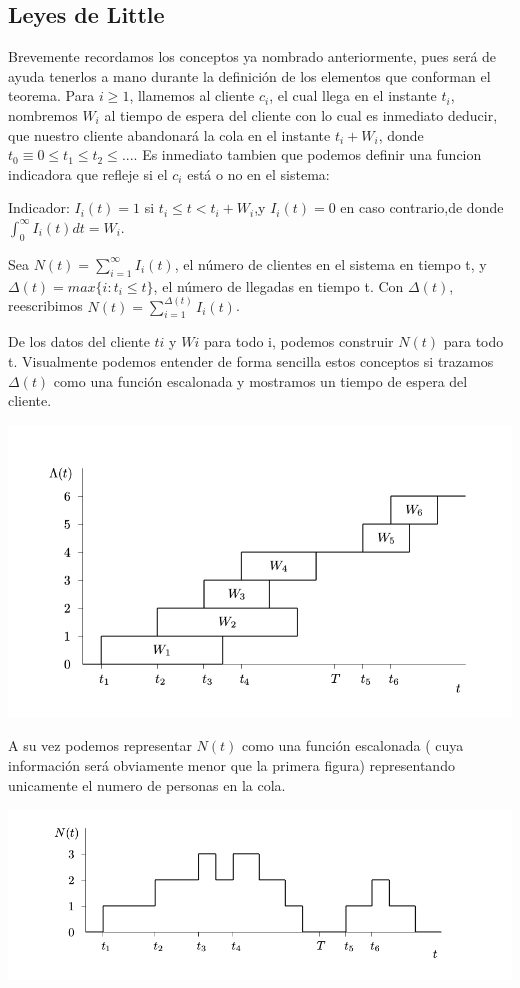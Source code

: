 \documentclass[a4paper,10pt]{scrartcl}
\theoremstyle{definition}
\numberwithin{equation}{section}
\begin{document}
\subsection{Leyes de Little}
Brevemente recordamos los conceptos ya nombrado anteriormente, pues será de ayuda tenerlos a mano durante la definición de los elementos que conforman el teorema.
Para $i \geq 1$, llamemos al cliente $c_i$, el cual llega en el instante $t_i$, nombremos $W_i$ al tiempo de espera del cliente con lo cual es inmediato deducir, que nuestro cliente abandonará la cola en el instante $t_i + W_i$, donde $t_0 \equiv 0 \leq t_1 \leq t_2 \leq... $.
Es inmediato tambien que podemos definir una funcion indicadora que refleje si el $c_i$ está o no en el sistema:

Indicador: $I_i(t) = 1 $ si $ t_i \leq t <t_i+W_i$,y $I_i (t) = 0$ en caso contrario,de donde  $\int_{0}^{\infty} I_i(t)dt=W_i$.

Sea $N(t) = \sum_{i=1}^{\infty} I_i(t)$, el número de clientes en el sistema en tiempo t, y $\Delta (t) = max \{i: t_i \leq t\}$, el número de llegadas en tiempo t. Con $\Delta (t)$, reescribimos $N(t) = \sum_{i=1}^{\Delta (t)} I_i(t)$.

De los datos del cliente ${t i}$ y ${W i}$ para todo i, podemos construir ${N (t)}$ para
todo t. Visualmente podemos entender de forma sencilla estos conceptos si trazamos ${\Delta (t)}$ como una función escalonada y mostramos un tiempo de espera del cliente.
\begin{center}
	\includegraphics[width=\textwidth]{./imgs/fig1.png}
\end{center}
 A su vez podemos representar $N(t)$ como una función escalonada ( cuya información será obviamente menor que la primera figura) representando unicamente el numero de personas en la cola.
\begin{center}
	\includegraphics[width=\textwidth]{./imgs/fig2.png}
\end{center}
\end{document}
